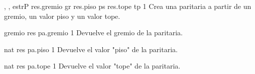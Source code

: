 {, , }{estrP}
{
	\state res.gremio \asig gr										
	\state res.piso \asig ps										
	\state res.tope \asig tp										
}
{1}
{Crea una paritaria a partir de un gremio, un valor piso y un valor tope.}

{}{gremio}
{
	\state res \asig pa.gremio										
}
{1}
{Devuelve el gremio de la paritaria.}

{}{nat}
{
	\state res \asig pa.piso										
}
{1}
{Devuelve el valor "piso" de la paritaria.}

{}{nat}
{
	\state res \asig pa.tope										
}
{1}
{Devuelve el valor "tope" de la paritaria.}